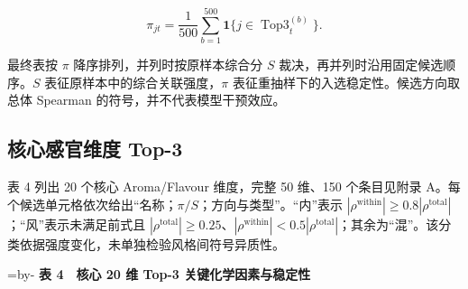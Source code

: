 \documentclass[
  chinese,
  11pt,
]{article}
\makeatletter
\newcommand{\EnsureSpace}[1]{\par\begingroup\@tempdima=\pagegoal\advance\@tempdima by-\pagetotal\ifdim\@tempdima<#1\newpage\fi\endgroup}
\makeatother
\begin{document}
\[
\pi_{jt}=\frac1{500}\sum_{b=1}^{500}\mathbf1\{j\in\operatorname{Top3}^{(b)}_t\}.
\]

最终表按 \(\pi\) 降序排列，并列时按原样本综合分 \(S\)
裁决，再并列时沿用固定候选顺序。\(S\)
表征原样本中的综合关联强度，\(\pi\)
表征重抽样下的入选稳定性。候选方向取总体 Spearman
的符号，并不代表模型干预效应。

\subsection{核心感官维度
Top-3}\label{ux6838ux5fc3ux611fux5b98ux7ef4ux5ea6-top-3}

表 4 列出 20 个核心 Aroma/Flavour 维度，完整 50 维、150 个条目见附录
A。每个候选单元格依次给出``名称；\(\pi/S\)；方向与类型''。``内''表示
\(|\rho^{\mathrm{within}}|\ge0.8|\rho^{\mathrm{total}}|\)；``风''表示未满足前式且
\(|\rho^{\mathrm{total}}|\ge0.25\)、\(|\rho^{\mathrm{within}}|<0.5|\rho^{\mathrm{total}}|\)；其余为``混''。该分类依据强度变化，未单独检验风格间符号异质性。

\EnsureSpace{6\baselineskip}
\textbf{表 4　核心 20 维 Top-3 关键化学因素与稳定性}
\end{document}

